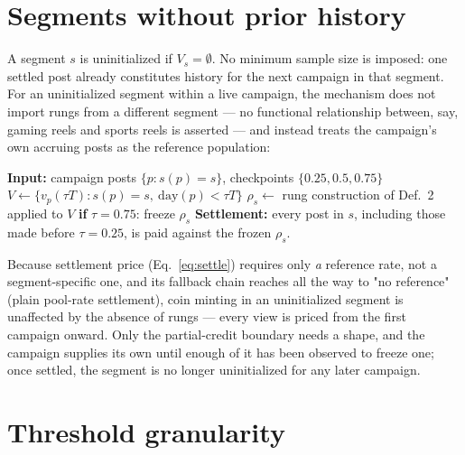 \documentclass[11pt]{article}
\begin{document}
\section{Segments without prior history}
\label{sec:coldstart}

A segment $s$ is uninitialized if $V_s = \emptyset$. No minimum sample size is imposed: one
settled post already constitutes history for the next campaign in that segment. For an
uninitialized segment within a live campaign, the mechanism does not import rungs from a different
segment — no functional relationship between, say, gaming reels and sports reels is asserted — and
instead treats the campaign's own accruing posts as the reference population:

\begin{algorithm}
\caption{Rung construction for an uninitialized segment}
\begin{algorithmic}[1]
\State \textbf{Input:} campaign posts $\{p : s(p)=s\}$, checkpoints $\{0.25,0.5,0.75\}$
  \State $V \gets \{v_p(\tau T) : s(p)=s,\ \text{day}(p) < \tau T\}$
  \State $\rho_s \gets$ rung construction of Def.~2 applied to $V$
  \State \textbf{if} $\tau=0.75$: freeze $\rho_s$
\EndFor
\State \textbf{Settlement:} every post in $s$, including those made before $\tau=0.25$, is paid
against the frozen $\rho_s$.
\end{algorithmic}
\end{algorithm}

Because settlement price (Eq.~\eqref{eq:settle}) requires only \emph{a} reference rate, not a
segment-specific one, and its fallback chain reaches all the way to "no reference" (plain
pool-rate settlement), coin minting in an uninitialized segment is unaffected by the absence of
rungs — every view is priced from the first campaign onward. Only the partial-credit boundary needs
a shape, and the campaign supplies its own until enough of it has been observed to freeze one; once
settled, the segment is no longer uninitialized for any later campaign.

\section{Threshold granularity}
\label{sec:granularity}
\end{document}
